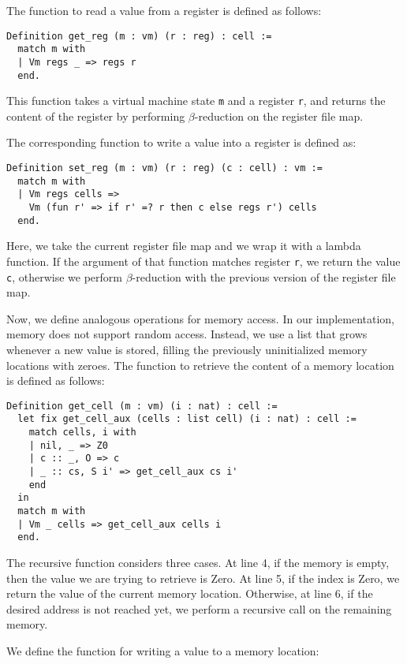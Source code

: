 The function to read a value from a register is defined as follows:

\begin{lstlisting}[style=Rocq]
Definition get_reg (m : vm) (r : reg) : cell :=
  match m with
  | Vm regs _ => regs r
  end.
\end{lstlisting}

This function takes a virtual machine state \texttt m and a register \texttt r, and returns the content of the register  by performing $\beta$-reduction on the register file map.

The corresponding function to write a value into a register is defined as:

\begin{lstlisting}[style=Rocq]
Definition set_reg (m : vm) (r : reg) (c : cell) : vm :=
  match m with
  | Vm regs cells =>
    Vm (fun r' => if r' =? r then c else regs r') cells
  end.
\end{lstlisting}

Here, we take the current register file map and we wrap it with a lambda function. If the argument of that function matches register \texttt r, we return the value \texttt c, otherwise we perform $\beta$-reduction with the previous version of the register file map.

Now, we define analogous operations for memory access. In our implementation, memory does not support random access. Instead, we use a list that grows whenever a new value is stored, filling the previously uninitialized memory locations with zeroes. The function to retrieve the content of a memory location is defined as follows:

\begin{lstlisting}[style=Rocq]
Definition get_cell (m : vm) (i : nat) : cell :=
  let fix get_cell_aux (cells : list cell) (i : nat) : cell :=
    match cells, i with
    | nil, _ => Z0
    | c :: _, O => c
    | _ :: cs, S i' => get_cell_aux cs i'
    end
  in
  match m with
  | Vm _ cells => get_cell_aux cells i
  end.
\end{lstlisting}

The recursive function considers three cases. At line 4,  if the memory is empty, then the value we are trying to retrieve is Zero.  At line 5, if the index is Zero, we return the value of the current memory location. Otherwise, at line 6, if the desired address is not reached yet, we perform a recursive call on the remaining memory.

We define the function for writing a value to a memory location:

